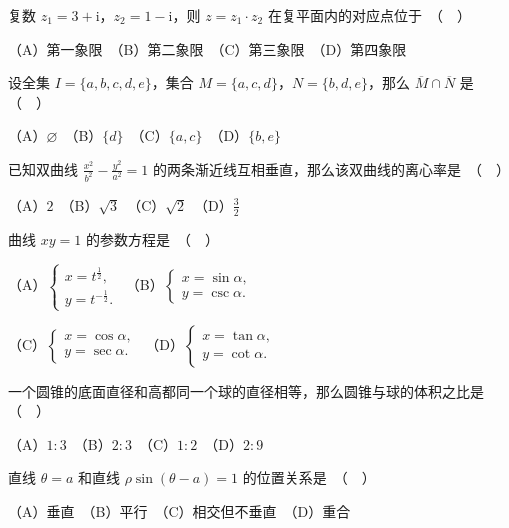 \begin{question}
复数 $z_1 = 3 + \mathrm{i}$，$z_2 = 1 - \mathrm{i}$，则 $z = z_1 \cdot z_2$ 在复平面内的对应点位于　（　）

（A）第一象限　（B）第二象限　（C）第三象限　（D）第四象限

\end{question}
\begin{question}
设全集 $I = \{a, b, c, d, e\}$，集合 $M = \{a, c, d\}$，$N = \{b, d, e\}$，那么 $\overline{M} \cap \overline{N}$ 是　（　）

（A）$\varnothing$　（B）$\{d\}$　（C）$\{a, c\}$　（D）$\{b, e\}$

\end{question}
\begin{question}
已知双曲线 $\frac{x^2}{b^2} - \frac{y^2}{a^2} = 1$ 的两条渐近线互相垂直，那么该双曲线的离心率是　（　）

（A）$2$　（B）$\sqrt{3}$　（C）$\sqrt{2}$　（D）$\frac{3}{2}$

\end{question}
\begin{question}
曲线 $xy = 1$ 的参数方程是　（　）

（A）$\begin{cases} x = t^{\frac{1}{2}}, \\ y = t^{-\frac{1}{2}}. \end{cases}$　（B）$\begin{cases} x = \sin\alpha, \\ y = \csc\alpha. \end{cases}$

（C）$\begin{cases} x = \cos\alpha, \\ y = \sec\alpha. \end{cases}$　（D）$\begin{cases} x = \tan\alpha, \\ y = \cot\alpha. \end{cases}$

\end{question}
\begin{question}
一个圆锥的底面直径和高都同一个球的直径相等，那么圆锥与球的体积之比是　（　）

（A）$1:3$　（B）$2:3$　（C）$1:2$　（D）$2:9$

\end{question}
\begin{question}
直线 $\theta = a$ 和直线 $\rho\sin(\theta - a) = 1$ 的位置关系是　（　）

（A）垂直　（B）平行　（C）相交但不垂直　（D）重合

\end{question}
